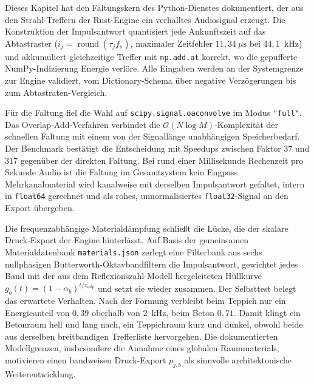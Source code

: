 Dieses Kapitel hat den Faltungskern des Python-Dienstes dokumentiert, der aus den
Strahl-Treffern der Rust-Engine ein verhalltes Audiosignal erzeugt. Die
Konstruktion der Impulsantwort quantisiert jede Ankunftszeit auf das Abtastraster
($i_j = \operatorname{round}(\tau_j f_s)$, maximaler Zeitfehler
$11{,}34~\mu\mathrm{s}$ bei $44{,}1$~kHz) und akkumuliert gleichzeitige Treffer
mit \texttt{np.add.at} korrekt, wo die gepufferte NumPy-Indizierung Energie
verlöre. Alle Eingaben werden an der Systemgrenze zur Engine validiert, vom
Dictionary-Schema über negative Verzögerungen bis zum Abtastraten-Vergleich.

Für die Faltung fiel die Wahl auf \texttt{scipy.signal.oaconvolve} im Modus
\texttt{"full"}. Das Overlap-Add-Verfahren verbindet die
$\mathcal{O}(N \log M)$-Komplexität der schnellen Faltung mit einem von der
Signallänge unabhängigen Speicherbedarf. Der Benchmark bestätigt die Entscheidung
mit Speedups zwischen Faktor $37$ und $317$ gegenüber der direkten Faltung. Bei
rund einer Millisekunde Rechenzeit pro Sekunde Audio ist die Faltung im
Gesamtsystem kein Engpass. Mehrkanalmaterial wird kanalweise mit derselben
Impulsantwort gefaltet, intern in \texttt{float64} gerechnet und als rohes,
unnormalisiertes \texttt{float32}-Signal an den Export übergeben.

Die frequenzabhängige Materialdämpfung schließt die Lücke, die der skalare
Druck-Export der Engine hinterlässt. Auf Basis der gemeinsamen Materialdatenbank
\texttt{materials.json} zerlegt eine Filterbank aus sechs nullphasigen
Butterworth-Oktavbandfiltern die Impulsantwort, gewichtet jedes Band mit der aus
dem Reflexionszahl-Modell hergeleiteten Hüllkurve
$g_b(t) = (1 - \alpha_b)^{t/\tau_{\mathrm{mfp}}}$ und setzt sie wieder zusammen.
Der Selbsttest belegt das erwartete Verhalten. Nach der Formung verbleibt beim
Teppich nur ein Energieanteil von $0{,}39$ oberhalb von $2$~kHz, beim Beton
$0{,}71$. Damit klingt ein Betonraum hell und lang nach, ein Teppichraum kurz und
dunkel, obwohl beide aus derselben breitbandigen Trefferliste hervorgehen.
Die dokumentierten Modellgrenzen, insbesondere die Annahme eines globalen Raummaterials, motivieren einen bandweisen Druck-Export $p_{j,b}$ als sinnvolle architektonische Weiterentwicklung.


